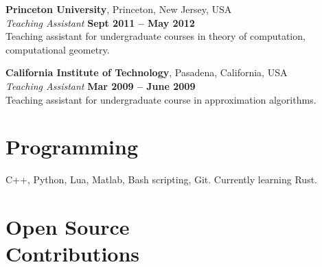 \documentclass[margin,line]{resume}
\begin{document}
\begin{resume}
    \textbf{Princeton University}, Princeton, New Jersey, USA \vspace{2mm}\\\vspace{1mm}%
    \textsl{Teaching Assistant} \hfill \textbf{Sept 2011 -- May 2012}\\
    Teaching assistant for undergraduate courses in theory of computation, computational geometry.

\newpage

    \textbf{California Institute of Technology}, Pasadena, California, USA \vspace{2mm}\\\vspace{1mm}%
    \textsl{Teaching Assistant} \hfill \textbf{Mar 2009 -- June 2009}\\
    Teaching assistant for undergraduate course in approximation algorithms.


       


    \section{\mysidestyle Programming} 

    C++, Python, Lua, Matlab, Bash scripting, Git. Currently learning Rust.

    \section{\mysidestyle Open Source\\Contributions}


\end{resume}
\end{document}
